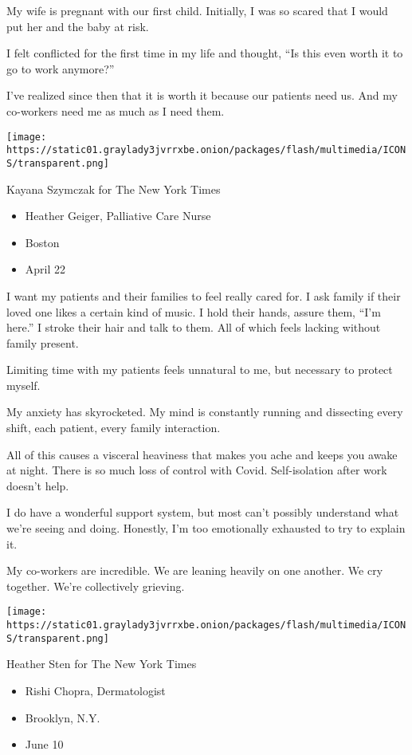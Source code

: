 My wife is pregnant with our first child. Initially, I was so scared
that I would put her and the baby at risk.

I felt conflicted for the first time in my life and thought, ``Is this
even worth it to go to work anymore?''

I've realized since then that it is worth it because our patients need
us. And my co-workers need me as much as I need them.

\texttt{[image: https://static01.graylady3jvrrxbe.onion/packages/flash/multimedia/ICONS/transparent.png]}

Kayana Szymczak for The New York Times

\begin{itemize}
\tightlist
\item
  Heather Geiger, Palliative Care Nurse
\item
  Boston
\item
  April 22
\end{itemize}

I want my patients and their families to feel really cared for. I ask
family if their loved one likes a certain kind of music. I hold their
hands, assure them, ``I'm here.'' I stroke their hair and talk to them.
All of which feels lacking without family present.

Limiting time with my patients feels unnatural to me, but necessary to
protect myself.

My anxiety has skyrocketed. My mind is constantly running and dissecting
every shift, each patient, every family interaction.

All of this causes a visceral heaviness that makes you ache and keeps
you awake at night. There is so much loss of control with Covid.
Self-isolation after work doesn't help.

I do have a wonderful support system, but most can't possibly understand
what we're seeing and doing. Honestly, I'm too emotionally exhausted to
try to explain it.

My co-workers are incredible. We are leaning heavily on one another. We
cry together. We're collectively grieving.

\texttt{[image: https://static01.graylady3jvrrxbe.onion/packages/flash/multimedia/ICONS/transparent.png]}

Heather Sten for The New York Times

\begin{itemize}
\tightlist
\item
  Rishi Chopra, Dermatologist
\item
  Brooklyn, N.Y.
\item
  June 10
\end{itemize}

